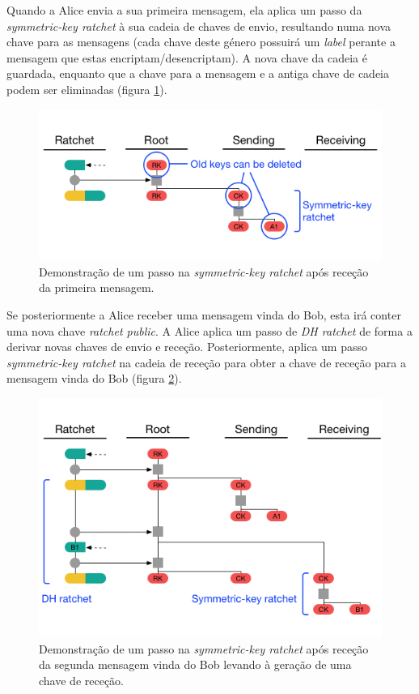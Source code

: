 Quando a Alice envia a sua primeira mensagem, ela aplica um passo da \textit{symmetric-key ratchet} à sua cadeia de chaves de envio, resultando numa nova chave para as mensagens (cada chave deste género possuirá um \textit{label} perante a mensagem que estas encriptam/desencriptam). A nova chave da cadeia é guardada, enquanto que a chave para a mensagem e a antiga chave de cadeia podem ser eliminadas (figura \ref{diagram:DR2}).

\begin{figure}[H]
\begin{center}
\includegraphics[width=12cm]{img/DR2.png}
\caption{Demonstração de um passo na \textit{symmetric-key ratchet} após receção da primeira mensagem.}
\label{diagram:DR2} 
\centering
\end{center}
\end{figure}

Se posteriormente a Alice receber uma mensagem vinda do Bob, esta irá conter uma nova chave \textit{ratchet public}. A Alice aplica um passo de \textit{DH ratchet} de forma a derivar novas chaves de envio e receção. Posteriormente, aplica um passo \textit{symmetric-key ratchet} na cadeia de receção para obter a chave de receção para a mensagem vinda do Bob (figura \ref{diagram:DR3}).

\begin{figure}[H]
\begin{center}
\includegraphics[width=12cm]{img/DR3.png}
\caption{Demonstração de um passo na \textit{symmetric-key ratchet} após receção da segunda mensagem vinda do Bob levando à geração de uma chave de receção.}
\label{diagram:DR3} 
\centering
\end{center}
\end{figure}


